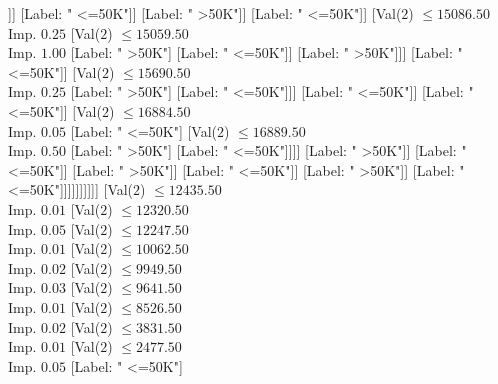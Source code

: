 \documentclass[margin=10pt]{standalone}
\begin{document}
\begin{forest}
																																							[Label: " <=50K"]
																																							[Label: " >50K"]]]
																																					[Label: " <=50K"]]
																																				[Label: " >50K"]]
																																			[Label: " <=50K"]]
																																		[Val($2$) $ \leq 15086.50$ \\ Imp. $0.25$
																																			[Val($2$) $ \leq 15059.50$ \\ Imp. $1.00$
																																				[Label: " >50K"]
																																				[Label: " <=50K"]]
																																			[Label: " >50K"]]]
																																	[Label: " <=50K"]]
																																[Val($2$) $ \leq 15690.50$ \\ Imp. $0.25$
																																	[Label: " >50K"]
																																	[Label: " <=50K"]]]
																															[Label: " <=50K"]]
																														[Label: " <=50K"]]
																													[Val($2$) $ \leq 16884.50$ \\ Imp. $0.05$
																														[Label: " <=50K"]
																														[Val($2$) $ \leq 16889.50$ \\ Imp. $0.50$
																															[Label: " >50K"]
																															[Label: " <=50K"]]]]
																												[Label: " >50K"]]
																											[Label: " <=50K"]]
																										[Label: " >50K"]]
																									[Label: " <=50K"]]
																								[Label: " >50K"]]
																							[Label: " <=50K"]]]]]]]]]]
														[Val($2$) $ \leq 12435.50$ \\ Imp. $0.01$
															[Val($2$) $ \leq 12320.50$ \\ Imp. $0.05$
																[Val($2$) $ \leq 12247.50$ \\ Imp. $0.01$
																	[Val($2$) $ \leq 10062.50$ \\ Imp. $0.02$
																		[Val($2$) $ \leq 9949.50$ \\ Imp. $0.03$
																			[Val($2$) $ \leq 9641.50$ \\ Imp. $0.01$
																				[Val($2$) $ \leq 8526.50$ \\ Imp. $0.02$
																					[Val($2$) $ \leq 3831.50$ \\ Imp. $0.01$
																						[Val($2$) $ \leq 2477.50$ \\ Imp. $0.05$
																							[Label: " <=50K"]

\end{forest}
\end{document}
